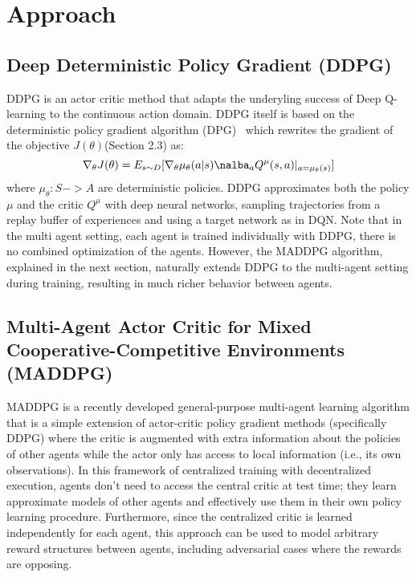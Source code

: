 
\section{Approach}
\label{sec:approach}

\subsection{Deep Deterministic Policy Gradient (DDPG)}
DDPG is an actor critic method that adapts the underyling success of Deep Q-learning 
to the continuous action domain. DDPG itself is based on the deterministic
policy gradient algorithm (DPG)~\cite{silver2014deterministic} which rewrites the gradient
of the objective $J(\theta)$(Section 2.3) as:
\begin{equation}
\nabla_{\theta}J(\theta) = E_{s \sim D} [\nabla_{\theta}\mu_{\theta}(a|s)\nalba_{a} Q^{\mu}(s,a)|_{a = \mu_{\theta}(s)}]
\end{equation}
where $\mu_{\theta}: S -> A$ are deterministic policies. DDPG approximates
both the policy $\mu$ and the critic $Q^{\mu}$ with deep neural networks, sampling
trajectories from a replay buffer of experiences and using a target network as 
in DQN. Note that in the multi agent setting, each agent is trained individually
with DDPG, there is no combined optimization of the agents. However, the MADDPG 
algorithm, explained in the next section, naturally extends DDPG to the multi-agent
setting during training, resulting in much richer behavior between agents. 

\subsection{Multi-Agent Actor Critic for Mixed Cooperative-Competitive Environments (MADDPG)}
MADDPG is a recently developed general-purpose multi-agent learning algorithm
that is a simple extension of actor-critic policy gradient methods (specifically DDPG) 
where the critic is augmented with extra information about the policies of other 
agents while the actor only has access to local information (i.e., its own
observations). In this framework of centralized training with decentralized
execution, agents don’t need to access the central critic at test time; they
learn approximate models of other agents and effectively use them in their own
policy learning procedure. Furthermore, since the centralized critic is
learned independently for each agent, this approach can be used to model arbitrary 
reward structures between agents, including adversarial cases where the rewards are opposing.

